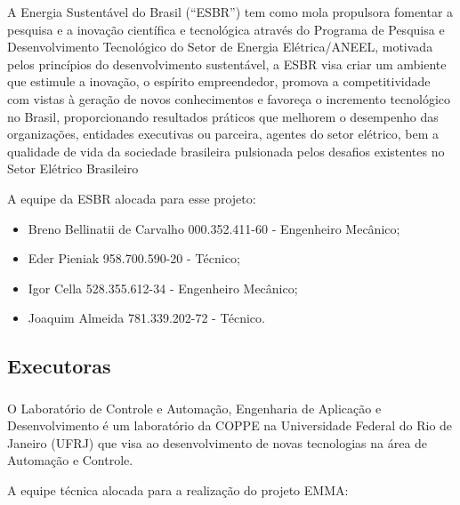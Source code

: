 A Energia Sustentável do Brasil (“ESBR”) tem como mola propulsora fomentar a
pesquisa e a inovação científica e tecnológica através do Programa de Pesquisa e
Desenvolvimento Tecnológico do Setor de Energia Elétrica/ANEEL, motivada pelos
princípios do desenvolvimento sustentável, a ESBR visa criar um ambiente que
estimule a inovação, o espírito empreendedor, promova a competitividade com
vistas à geração de novos conhecimentos e favoreça o incremento tecnológico no
Brasil, proporcionando resultados práticos que melhorem o desempenho das
organizações, entidades executivas ou parceira, agentes do setor elétrico, bem a
qualidade de vida da sociedade brasileira pulsionada pelos desafios existentes
no Setor Elétrico Brasileiro

A equipe da ESBR alocada para esse projeto:

\begin{itemize}
  \item Breno Bellinatii de Carvalho 000.352.411-60 - Engenheiro Mecânico;
  \item Eder Pieniak 958.700.590-20 - Técnico;
  \item Igor Cella 528.355.612-34 - Engenheiro Mecânico;
  \item Joaquim Almeida 781.339.202-72 - Técnico.
\end{itemize}

\subsection{Executoras}

\subsubsection{} O Laboratório de Controle e Automação, Engenharia
de Aplicação e Desenvolvimento é um laboratório da COPPE na Universidade
Federal do Rio de Janeiro (UFRJ) que visa ao desenvolvimento de novas
tecnologias na área de Automação e Controle.


A equipe técnica alocada para a realização do projeto EMMA:


